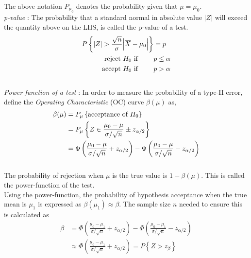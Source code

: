The above notation $ P_{\mu_0} $ denotes the probability given that $ \mu = \mu_0 $. \\

\textit{p-value} : The probability that a standard normal in absolute value $ |Z| $ will exceed the quantity above on the LHS, is called the p-value of a test. \\
\begin{align}
	P \left\{ |Z| > \frac{\sqrt{n}}{\sigma} \Big| \overline{X} - \mu_0 \Big| \right\} &= p \nonumber \\
	\text{reject $ H_0 $ if } \qquad & p \leq \alpha \nonumber \\
	\text{accept $ H_0 $ if } \qquad & p > \alpha	
\end{align} \\

\textit{Power function of a test} : In order to measure the probability of a type-II error, define the \textit{Operating Characteristic} (OC) curve $ \beta(\mu) $ as,\\

\begin{align}
	\beta(\mu) &= P_{\mu} \left\{\text{acceptance of $ H_0 $}\right\} \\
	&= P_{\mu} \left\{ Z \in \frac{\mu_0 - \mu}{\sigma/\sqrt{n}} \pm z_{\alpha/2} \right\} \nonumber \\
	&= \Phi\left(\frac{\mu_0 - \mu}{\sigma/\sqrt{n}} + z_{\alpha/2}\right) - \Phi\left( \frac{\mu_0 - \mu}{\sigma/\sqrt{n}} - z_{\alpha/2} \right)
\end{align}\\

The probability of rejection when $ \mu $ is the true value is $ 1 - \beta(\mu) $. This is called the power-function of the test. \\

Using the power-function, the probability of hypothesis acceptance when the true mean is $ \mu_1 $ is expressed as $ \beta(\mu_1) \approx \beta $. The sample size $ n $ needed to ensure this is calculated as\\

\begin{align}
	\beta &= \Phi\left(\frac{\mu_0 - \mu_1}{\sigma/\sqrt{n}} + z_{\alpha/2}\right) - \Phi\left( \frac{\mu_0 - \mu_1}{\sigma/\sqrt{n}} - z_{\alpha/2} \right) \nonumber \\
	&\approx \Phi\left(\frac{\mu_0 - \mu_1}{\sigma/\sqrt{n}} + z_{\alpha/2}\right) = P\left\{Z > z_\beta\right\}\nonumber
\end{align}\\

